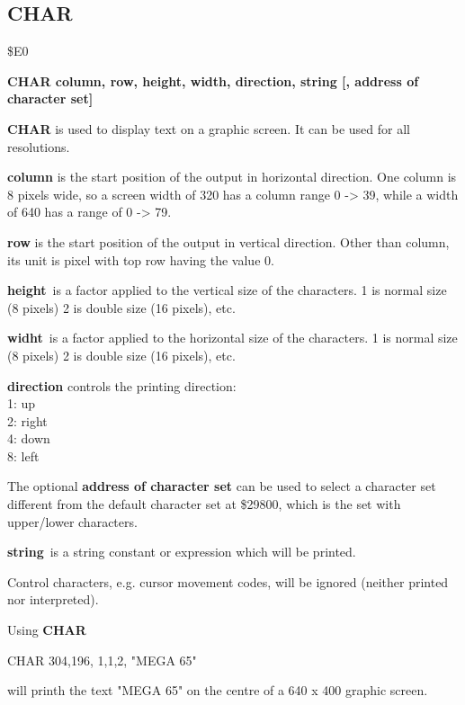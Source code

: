 \subsection{CHAR}
\begin{description}[leftmargin=3cm,style=nextline]
\item [Token:] \$E0
\item [Format:] {\bf CHAR column, row, height, width, direction, string
                [, address of character set]}
\item [Usage:]  {\bf CHAR} is used to display text on a graphic screen.
                It can be used for all resolutions.

                {\bf column} is the start position of the output
                in horizontal direction.
                One column is 8 pixels wide, so a screen width of 320
                has a column range 0 -> 39, while a width of 640
                has a range of 0 -> 79.

                {\bf row} is the start position of the output
                in vertical direction. Other than column, its unit is
                pixel with top row having the value 0.

                {\bf height} is a factor applied to the vertical
                size of the characters. 1 is normal size (8 pixels)
                2 is double size (16 pixels), etc.

                {\bf widht} is a factor applied to the horizontal
                size of the characters. 1 is normal size (8 pixels)
                2 is double size (16 pixels), etc.

                {\bf direction} controls the printing direction: \\
                1: up     \\
                2: right  \\
                4: down   \\
                8: left

                The optional {\bf address of character set} can be used
                to select a character set different from the default
                character set at \$29800, which is the set with
                upper/lower characters.

                {\bf string} is a string constant or expression
                which will be printed.

\item [Remarks:]
                Control characters,
                e.g. cursor movement codes, will be ignored
                (neither printed nor interpreted).


\item [Example:] Using {\bf CHAR}
\begin{screenoutput}
CHAR 304,196, 1,1,2,  "MEGA 65"
\end{screenoutput}
will printh the text "MEGA 65" on the centre of a 640 x 400 graphic screen.
\end{description}

